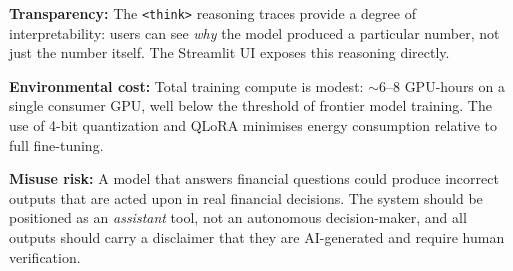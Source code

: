 \documentclass[10pt]{article}
\begin{document}
\textbf{Transparency:} The \texttt{<think>} reasoning traces provide a degree of interpretability: users can see \textit{why} the model produced a particular number, not just the number itself. The Streamlit UI exposes this reasoning directly.

\textbf{Environmental cost:} Total training compute is modest: ${\sim}$6--8 GPU-hours on a single consumer GPU, well below the threshold of frontier model training. The use of 4-bit quantization and QLoRA minimises energy consumption relative to full fine-tuning.

\textbf{Misuse risk:} A model that answers financial questions could produce incorrect outputs that are acted upon in real financial decisions. The system should be positioned as an \textit{assistant} tool, not an autonomous decision-maker, and all outputs should carry a disclaimer that they are AI-generated and require human verification.
\end{document}
